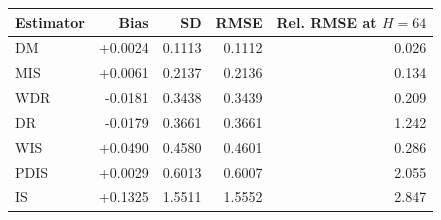 \begin{tabular}{lrrrr}
\toprule
Estimator & Bias & SD & RMSE & Rel. RMSE at $H=64$ \\
\midrule
DM & +0.0024 & 0.1113 & 0.1112 & 0.026 \\
MIS & +0.0061 & 0.2137 & 0.2136 & 0.134 \\
WDR & -0.0181 & 0.3438 & 0.3439 & 0.209 \\
DR & -0.0179 & 0.3661 & 0.3661 & 1.242 \\
WIS & +0.0490 & 0.4580 & 0.4601 & 0.286 \\
PDIS & +0.0029 & 0.6013 & 0.6007 & 2.055 \\
IS & +0.1325 & 1.5511 & 1.5552 & 2.847 \\
\bottomrule
\end{tabular}
